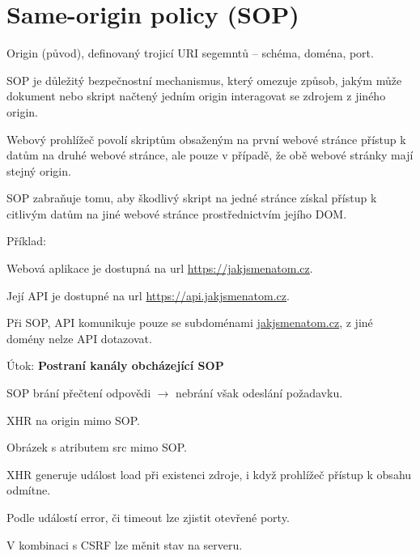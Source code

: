 
\section{Same-origin policy (SOP)}

\begin{compactitem}
    \item Origin (původ), definovaný trojicí URI segemntů -- schéma, doména, port.

    \item SOP je důležitý bezpečnostní mechanismus, který omezuje způsob, jakým může dokument nebo skript načtený jedním origin interagovat se zdrojem z jiného origin. \begin{compactitem}
        \item Webový prohlížeč povolí skriptům obsaženým na první webové stránce přístup k datům na druhé webové stránce, ale pouze v případě, že obě webové stránky mají stejný origin.
    \end{compactitem}

    \item SOP zabraňuje tomu, aby škodlivý skript na jedné stránce získal přístup k citlivým datům na jiné webové stránce prostřednictvím jejího DOM.

    \item Příklad: \begin{compactitem}
        \item Webová aplikace je dostupná na url \url{https://jakjsmenatom.cz}.
        \item Její API je dostupné na url \url{https://api.jakjsmenatom.cz}.
        \item Při SOP, API komunikuje pouze se subdoménami \url{jakjsmenatom.cz}, z jiné domény nelze API dotazovat.
    \end{compactitem}

    \item Útok: \textbf{Postraní kanály obcházející SOP} \begin{compactitem}
        \item SOP brání přečtení odpovědi $\rightarrow$ nebrání však odeslání požadavku. \begin{compactitem}
            \item XHR na origin mimo SOP.
            \item Obrázek s atributem src mimo SOP.
        \end{compactitem}
        \item XHR generuje událost load při existenci zdroje, i když prohlížeč přístup k obsahu odmítne. \begin{compactitem}
            \item Podle událostí error, či timeout lze zjistit otevřené porty.
        \end{compactitem}
        \item V kombinaci s CSRF lze měnit stav na serveru.
    \end{compactitem}
\end{compactitem}

